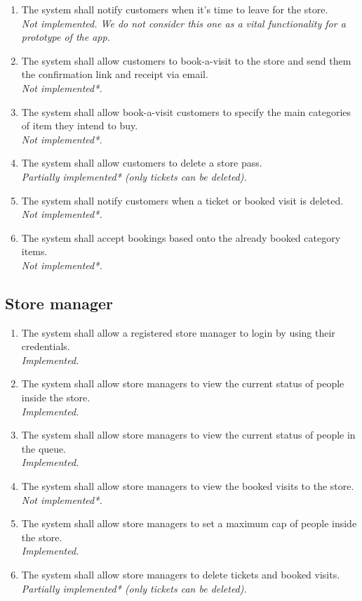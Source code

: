 \begin{enumerate}[series=requirements, label=\textbf{R.\arabic*}]
    \item The system shall notify customers when it's time to leave for the store.\\[4pt] \textit{Not implemented. We do not consider this one as a vital functionality for a prototype of the app.}
    \item The system shall allow customers to book-a-visit to the store and send them the confirmation link and receipt via email.\\[4pt] \textit{Not implemented*.}
    \item The system shall allow book-a-visit customers to specify the main categories of item they intend to buy.\\[4pt] \textit{Not implemented*.}
    \item The system shall allow customers to delete a store pass.\\[4pt] \textit{Partially implemented* (only tickets can be deleted).}
    \item The system shall notify customers when a ticket or booked visit is deleted.\\[4pt] \textit{Not implemented*.}
    \item The system shall accept bookings based onto the already booked category items.\\[4pt] \textit{Not implemented*.}
\end{enumerate}

\subsection{Store manager}
\begin{enumerate}[resume*=requirements]
    \item The system shall allow a registered store manager to login by using their credentials.\\[4pt] \textit{Implemented.}
    \item The system shall allow store managers to view the current status of people inside the store.\\[4pt] \textit{Implemented.}
    \item The system shall allow store managers to view the current status of people in the queue.\\[4pt] \textit{Implemented.}
    \item The system shall allow store managers to view the booked visits to the store.\\[4pt] \textit{Not implemented*.}
    \item The system shall allow store managers to set a maximum cap of people inside the store.\\[4pt] \textit{Implemented.}
    \item The system shall allow store managers to delete tickets and booked visits.\\[4pt] \textit{Partially implemented* (only tickets can be deleted).}
\end{enumerate}

